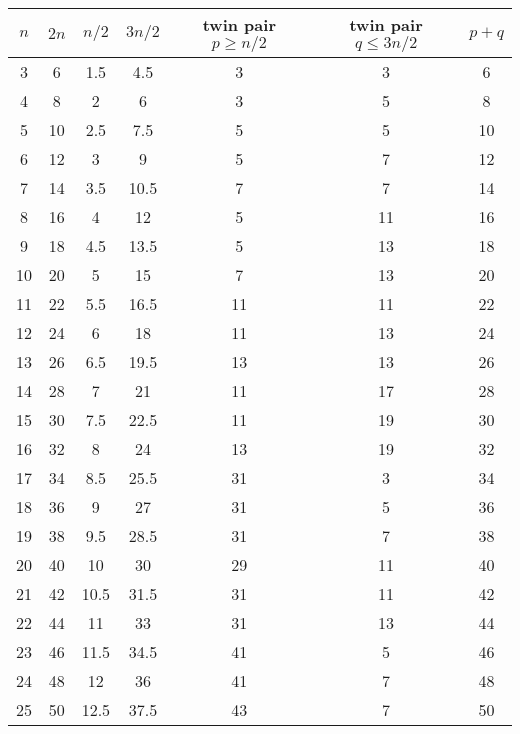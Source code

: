 \begin{solution}
    \begin{center}
        \begin{tabular}{ |c|c|c|c|c|c|c| } 
        \hline 
        $n$ & $2n$ & $n/2$ & $3n/2$ & twin pair $p \geq n/2$ & twin pair $q\leq 3n/2$ & $p+q$\\
        \hline
        3 & 6 & 1.5 & 4.5 & 3 & 3 & 6 \\
        \hline
        4 & 8 & 2 & 6 & 3 & 5 & 8 \\
        \hline
        5 & 10 & 2.5 & 7.5 & 5 & 5 & 10 \\
        \hline
        6 & 12 & 3 & 9 & 5 & 7 & 12 \\
        \hline
        7 & 14 & 3.5 & 10.5 & 7 & 7 & 14 \\
        \hline
        8 & 16 & 4 & 12 & 5 & 11 & 16 \\
        \hline
        9 & 18 & 4.5 & 13.5 & 5 & 13 & 18 \\
        \hline
        10 & 20 & 5 & 15 & 7 & 13 & 20 \\
        \hline
        11 & 22 & 5.5 & 16.5 & 11 & 11 & 22 \\
        \hline
        12 & 24 & 6 & 18 & 11 & 13 & 24 \\
        \hline
        13 & 26 & 6.5 & 19.5 & 13 & 13 & 26 \\
        \hline
        14 & 28 & 7 & 21 & 11 & 17 & 28 \\
        \hline
        15 & 30 & 7.5 & 22.5 & 11 & 19 & 30 \\
        \hline
        16 & 32 & 8 & 24 & 13 & 19 & 32 \\
        \hline
        17 & 34 & 8.5 & 25.5 & 31 & 3 & 34 \\
        \hline
        18 & 36 & 9 & 27 & 31 & 5 & 36 \\
        \hline
        19 & 38 & 9.5 & 28.5 & 31 & 7 & 38 \\
        \hline
        20 & 40 & 10 & 30 & 29 & 11 & 40 \\
        \hline
        21 & 42 & 10.5 & 31.5 & 31 & 11 & 42 \\
        \hline
        22 & 44 & 11 & 33 & 31 & 13 & 44 \\
        \hline
        23 & 46 & 11.5 & 34.5 & 41 & 5 & 46 \\
        \hline
        24 & 48 & 12 & 36 & 41 & 7 & 48 \\
        \hline
        25 & 50 & 12.5 & 37.5 & 43 & 7 & 50 \\

\end{tabular}
\end{center}
\end{solution}
